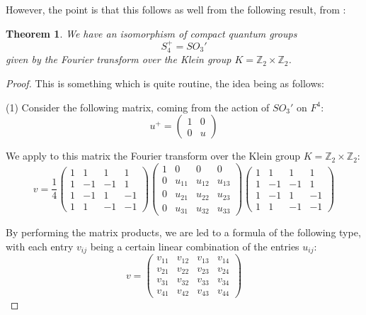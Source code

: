 \documentclass[12pt]{amsbook}
\newtheorem{theorem}{Theorem}[chapter]
\begin{document}
\bigskip

However, the point is that this follows as well from the following result, from \cite{bb1}:


\begin{theorem}
We have an isomorphism of compact quantum groups
$$S_4^+=SO_3'$$
given by the Fourier transform over the Klein group $K=\mathbb Z_2\times\mathbb Z_2$.
\end{theorem}

\begin{proof}
This is something which is quite routine, the idea being as follows:

\medskip

(1) Consider the following matrix, coming from the action of $SO_3'$ on $F^4$:
$$u^+=\begin{pmatrix}1&0\\0&u\end{pmatrix}$$

We apply to this matrix the Fourier transform over the Klein group $K=\mathbb Z_2\times\mathbb Z_2$: 
$$v=
\frac{1}{4}
\begin{pmatrix}
1&1&1&1\\
1&-1&-1&1\\
1&-1&1&-1\\
1&1&-1&-1
\end{pmatrix}
\begin{pmatrix}
1&0&0&0\\
0&u_{11}&u_{12}&u_{13}\\
0&u_{21}&u_{22}&u_{23}\\
0&u_{31}&u_{32}&u_{33}
\end{pmatrix}
\begin{pmatrix}
1&1&1&1\\
1&-1&-1&1\\
1&-1&1&-1\\
1&1&-1&-1
\end{pmatrix}$$

By performing the matrix products, we are led to a formula of the following type, with each entry $v_{ij}$ being a certain linear combination of the entries $u_{ij}$:
$$v=\begin{pmatrix}
v_{11}&v_{12}&v_{13}&v_{14}\\
v_{21}&v_{22}&v_{23}&v_{24}\\
v_{31}&v_{32}&v_{33}&v_{34}\\
v_{41}&v_{42}&v_{43}&v_{44}
\end{pmatrix}$$


\end{proof}
\end{document}
